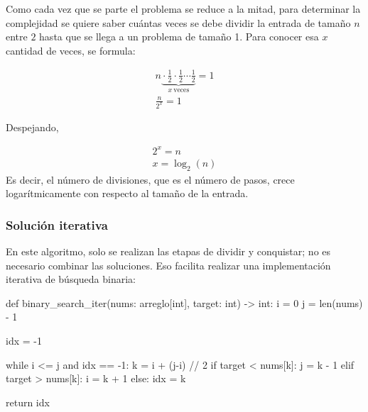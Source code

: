 Como cada vez que se parte el problema se reduce a la mitad, para determinar la complejidad se quiere saber cuántas veces se debe dividir la entrada de tamaño \(n\) entre \(2\) hasta que se llega a un problema de tamaño 1. Para conocer esa \(x\) cantidad de veces, se formula:

\begin{gather*}
  n \underbrace{{} \cdot \frac{1}{2} \cdot \frac{1}{2} \cdots \frac{1}{2}}_{x \ \text{veces}} = 1 \\
  \frac{n}{2^x} = 1
\end{gather*}

Despejando,

\begin{gather*}
  2^x = n \\
  x = \log_2(n)
\end{gather*}
Es decir, el número de divisiones, que es el número de pasos, crece logarítmicamente con respecto al tamaño de la entrada.

\subsubsection{Solución iterativa}

En este algoritmo, solo se realizan las etapas de dividir y conquistar; no es necesario combinar las soluciones. Eso facilita realizar una implementación iterativa de búsqueda binaria:
\begin{pseudocode}
def binary_search_iter(nums: arreglo[int], target: int) -> int:
    i = 0
    j = len(nums) - 1
    
    idx = -1

    while i <= j and idx == -1:
        k = i + (j-i) // 2
        if target < nums[k]:
            j = k - 1
        elif target > nums[k]:
            i = k + 1
        else:
            idx = k
        
    return idx
\end{pseudocode}


